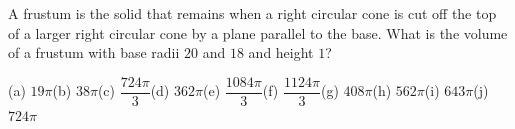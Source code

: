 A frustum is the solid that remains when a right circular cone is cut off the top of a larger right circular cone by a plane parallel to the base. What is the volume of a frustum with base radii $20$ and $18$ and height $1$?

(a) $19\pi$\quad (b) $38\pi$\quad (c) $\dfrac{724\pi}{3}$\quad (d) $362\pi$\quad (e) $\dfrac{1084\pi}{3}$\quad (f) $\dfrac{1124\pi}{3}$\quad (g) $408\pi$\quad (h) $562\pi$\quad (i) $643\pi$\quad (j) $724\pi$
